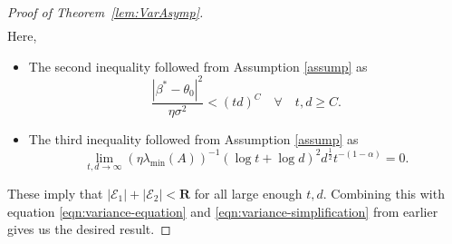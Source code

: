 \documentclass[11pt, reqno,english]{amsart}
\begin{document}
\begin{proof}[Proof of Theorem~\ref{lem:VarAsymp}]
\begin{align*}
\end{align*}
Here, 
\begin{itemize}
    \item The second inequality followed from Assumption \ref{assump} as $$\frac{|\beta^* - \theta_0|^2}{\eta \sigma^2} < (td)^{C} \quad \forall \quad  t, d \geq C.$$
    \item The third inequality followed from Assumption \ref{assump} as $$\lim\limits_{t,d \to \infty} (\eta \lambda_{\min}(A))^{-1}(\log t + \log d)^2d^{\frac{1}{2}}t^{-(1 - \alpha)} = 0.$$
\end{itemize}
These imply that $|\mathcal E_1| + |\mathcal E_2| < \mathbf{R}$ for all large enough $t,d$. Combining this with equation \ref{eqn:variance-equation} and \ref{eqn:variance-simplification} from earlier gives us the desired result.
\end{proof}
\end{document}
